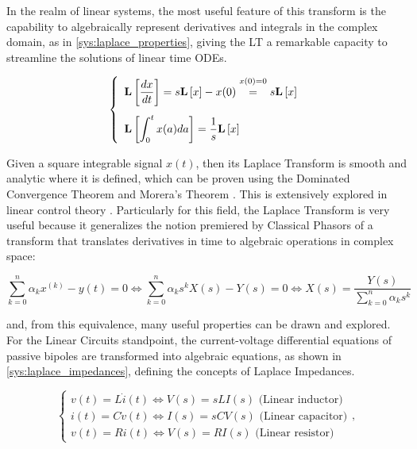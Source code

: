 	In the realm of linear systems, the most useful feature of this transform is the capability to algebraically represent derivatives and integrals in the complex domain, as in \eqref{sys:laplace_properties}, giving the LT a remarkable capacity to streamline the solutions of linear time ODEs.

\begin{equation}\left\{\begin{array}{l} \mathbf{L}\left[\dfrac{dx}{dt}\right] = s\mathbf{L}\left[x\right] - x(0) \stackrel{\raisebox{-2mm}{} x(0)=0}{=} s\mathbf{L}\left[x\right]\\[5mm] \mathbf{L}\left[\displaystyle \int_0^t x(a)da \right] = \dfrac{1}{s}\mathbf{L}\left[x\right]\end{array}\right. \label{sys:laplace_properties} \end{equation}
	
	Given a square integrable signal $x(t)$, then its Laplace Transform is smooth and analytic where it is defined, which can be proven using the Dominated Convergence Theorem and Morera's Theorem . This is extensively explored in linear control theory . Particularly for this field, the Laplace Transform is very useful because it generalizes the notion premiered by Classical Phasors of a transform that translates derivatives in time to algebraic operations in complex space:

\begin{equation} \sum_{k=0}^n \alpha_k x^{(k)} - y(t) = 0 \Leftrightarrow \sum_{k=0}^n \alpha_k s^k X(s) - Y(s) = 0 \Leftrightarrow X(s) = \dfrac{Y(s)}{\displaystyle\sum_{k=0}^n \alpha_k s^k} \end{equation}

	\noindent and, from this equivalence, many useful properties can be drawn and explored. For the Linear Circuits standpoint, the current-voltage differential equations of passive bipoles are transformed into algebraic equations, as shown in \eqref{sys:laplace_impedances}, defining the concepts of Laplace Impedances.

\begin{equation}\left\{\begin{array}{l} v(t) = L\dot{i}(t) \Leftrightarrow V(s) = sLI(s) \text{ (Linear inductor)}\\[3mm] i(t) = C\dot{v}(t) \Leftrightarrow I(s) = sCV(s) \text{ (Linear capacitor)}\\[3mm] v(t) = Ri(t) \Leftrightarrow V(s) = RI(s) \text{ (Linear resistor)}\end{array} \right. ,\label{sys:laplace_impedances}\end{equation}

